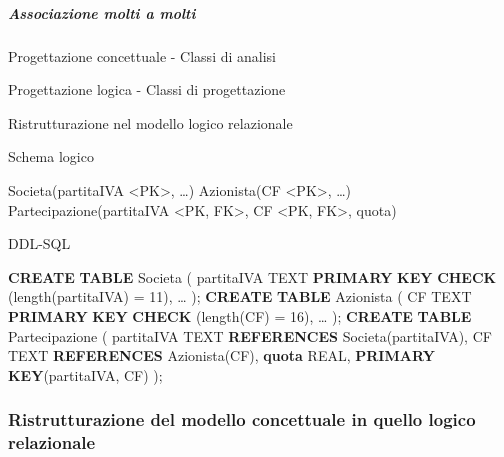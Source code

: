 \documentclass[italian,a4paper]{article}
\newenvironment{Shaded}{}{}
\newcommand{\DataTypeTok}[1]{\textcolor[rgb]{0.56,0.13,0.00}{#1}}
\newcommand{\DecValTok}[1]{\textcolor[rgb]{0.25,0.63,0.44}{#1}}
\newcommand{\FunctionTok}[1]{\textcolor[rgb]{0.02,0.16,0.49}{#1}}
\newcommand{\KeywordTok}[1]{\textcolor[rgb]{0.00,0.44,0.13}{\textbf{#1}}}
\newcommand{\NormalTok}[1]{#1}
\newcommand{\OperatorTok}[1]{\textcolor[rgb]{0.40,0.40,0.40}{#1}}
\begin{document}
\subparagraph{Associazione molti a
molti}\label{associazione-molti-a-molti}

Progettazione concettuale - Classi di analisi



Progettazione logica - Classi di progettazione



Ristrutturazione nel modello logico relazionale



Schema logico

\begin{Shaded}
\begin{Highlighting}[]
\NormalTok{Societa(partitaIVA \textless{}PK\textgreater{}, …)}
\NormalTok{Azionista(CF \textless{}PK\textgreater{}, …)}
\NormalTok{Partecipazione(partitaIVA \textless{}PK, FK\textgreater{}, CF \textless{}PK, FK\textgreater{}, quota)}
\end{Highlighting}
\end{Shaded}

DDL-SQL

\begin{Shaded}
\begin{Highlighting}[]
\KeywordTok{CREATE} \KeywordTok{TABLE}\NormalTok{ Societa (}
\NormalTok{    partitaIVA TEXT }\KeywordTok{PRIMARY} \KeywordTok{KEY} \KeywordTok{CHECK}\NormalTok{ (}\FunctionTok{length}\NormalTok{(partitaIVA) }\OperatorTok{=} \DecValTok{11}\NormalTok{),}
\NormalTok{    …}
\NormalTok{);}
\KeywordTok{CREATE} \KeywordTok{TABLE}\NormalTok{ Azionista (}
\NormalTok{    CF TEXT }\KeywordTok{PRIMARY} \KeywordTok{KEY} \KeywordTok{CHECK}\NormalTok{ (}\FunctionTok{length}\NormalTok{(CF) }\OperatorTok{=} \DecValTok{16}\NormalTok{),}
\NormalTok{    …}
\NormalTok{);}
\KeywordTok{CREATE} \KeywordTok{TABLE}\NormalTok{ Partecipazione (}
\NormalTok{    partitaIVA TEXT }\KeywordTok{REFERENCES}\NormalTok{ Societa(partitaIVA),}
\NormalTok{    CF TEXT }\KeywordTok{REFERENCES}\NormalTok{ Azionista(CF),}
    \KeywordTok{quota} \DataTypeTok{REAL}\NormalTok{,}
    \KeywordTok{PRIMARY} \KeywordTok{KEY}\NormalTok{(partitaIVA, CF)}
\NormalTok{);}
\end{Highlighting}
\end{Shaded}


\subsubsection{Ristrutturazione del modello concettuale in quello logico
relazionale}\label{ristrutturazione-del-modello-concettuale-in-quello-logico-relazionale}
\end{document}
